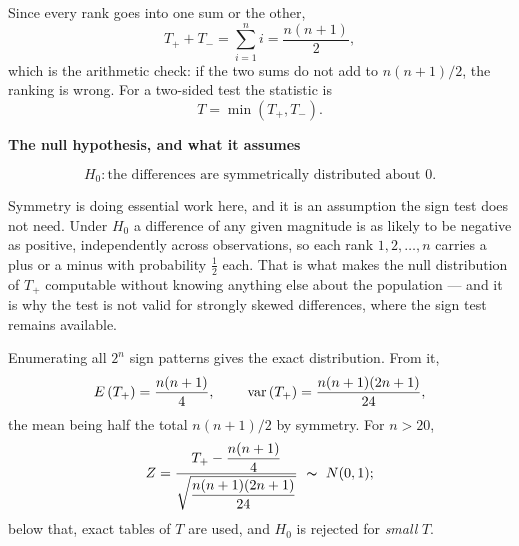 \documentclass[11pt,a4paper]{article}
\theoremstyle{definition}
\begin{document}
Since every rank goes into one sum or the other,
$$T_{+}+T_{-}=\sum^{n}_{i=1}i=\dfrac{n(n+1)}{2},$$
which is the arithmetic check: if the two sums do not add to $n(n+1)/2$, the
ranking is wrong. For a two-sided test the statistic is
$$T=\min\left(T_{+},T_{-}\right).$$

\begin{center}
\textbf{The null hypothesis, and what it assumes}
\end{center}

$$H_0:\text{the differences are symmetrically distributed about } 0 .$$

Symmetry is doing essential work here, and it is an assumption the sign test does
not need. Under $H_0$ a difference of any given magnitude is as likely to be
negative as positive, independently across observations, so each rank
$1,2,\dots,n$ carries a plus or a minus with probability $\tfrac{1}{2}$ each. That
is what makes the null distribution of $T_{+}$ computable without knowing anything
else about the population --- and it is why the test is not valid for strongly
skewed differences, where the sign test remains available.

Enumerating all $2^{n}$ sign patterns gives the exact distribution. From it,
$$E\left(T_{+}\right)=\dfrac{n(n+1)}{4},\hspace{0.8cm}
\operatorname{var}\left(T_{+}\right)=\dfrac{n(n+1)(2n+1)}{24},$$
the mean being half the total $n(n+1)/2$ by symmetry. For $n>20$,
$$Z=\dfrac{T_{+}-\dfrac{n(n+1)}{4}}{\sqrt{\dfrac{n(n+1)(2n+1)}{24}}}\ \thicksim\ N(0,1);$$
below that, exact tables of $T$ are used, and $H_0$ is rejected for \emph{small}
$T$.
\end{document}

